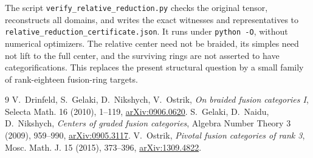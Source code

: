 \documentclass[11pt]{article}
\begin{document}
The script \texttt{verify\_relative\_reduction.py} checks the original
tensor, reconstructs all domains, and writes the exact witnesses and
representatives to \texttt{relative\_reduction\_certificate.json}.
It runs under \texttt{python -O}, without numerical optimizers.
The relative center need not be braided, its simples need not lift to
the full center, and the surviving rings are not asserted to have
categorifications. This replaces the present structural question by a
small family of rank-eighteen fusion-ring targets.

\begin{thebibliography}{9}
 V.~Drinfeld, S.~Gelaki, D.~Nikshych, V.~Ostrik,
\emph{On braided fusion categories I}, Selecta Math. 16 (2010), 1--119,
\href{https://arxiv.org/abs/0906.0620}{arXiv:0906.0620}.
 S.~Gelaki, D.~Naidu, D.~Nikshych,
\emph{Centers of graded fusion categories}, Algebra Number Theory 3
(2009), 959--990, \href{https://arxiv.org/abs/0905.3117}{arXiv:0905.3117}.
 V.~Ostrik, \emph{Pivotal fusion categories of rank 3},
Mosc. Math. J. 15 (2015), 373--396,
\href{https://arxiv.org/abs/1309.4822}{arXiv:1309.4822}.
\end{thebibliography}
\end{document}
